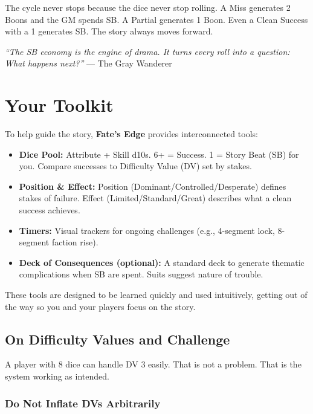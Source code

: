 The cycle never stops because the dice never stop rolling. A Miss generates 2 Boons and the GM spends SB. A Partial generates 1 Boon. Even a Clean Success with a 1 generates SB. The story always moves forward.

\noindent\textit{``The SB economy is the engine of drama. It turns every roll into a question: What happens next?''}
--- The Gray Wanderer

\section{Your Toolkit}
\label{sec:gm-toolkit}

To help guide the story, \textbf{Fate's Edge} provides interconnected tools:

\begin{itemize}
    \item \textbf{Dice Pool:} Attribute + Skill d10s. 6+ = Success. 1 = Story Beat (SB) for you. Compare successes to Difficulty Value (DV) set by stakes.
    \item \textbf{Position \& Effect:} Position (Dominant/Controlled/Desperate) defines stakes of failure. Effect (Limited/Standard/Great) describes what a clean success achieves.
    \item \textbf{Timers:} Visual trackers for ongoing challenges (e.g., 4-segment lock, 8-segment faction rise).
    \item \textbf{Deck of Consequences (optional):} A standard deck to generate thematic complications when SB are spent. Suits suggest nature of trouble.
\end{itemize}

These tools are designed to be learned quickly and used intuitively, getting out of the way so you and your players focus on the story.

\subsection{On Difficulty Values and Challenge}
\label{sub:dv-and-challenge}

A player with 8 dice can handle DV 3 easily. That is not a problem. That is the system working as intended.

\subsubsection{Do Not Inflate DVs Arbitrarily}


